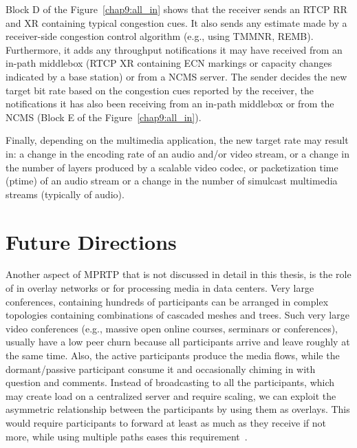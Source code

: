 Block D of the Figure~\ref{chap9:all_in} shows that the receiver sends an RTCP
RR and XR containing typical congestion cues. It also sends any estimate made
by a receiver-side congestion control algorithm (e.g., using TMMNR, REMB).
Furthermore, it adds any throughput notifications it may have received from an
in-path middlebox (RTCP XR containing ECN markings or capacity changes
indicated by a base station) or from a NCMS server. The sender decides the new
target bit rate based on the congestion cues reported by the receiver, the
notifications it has also been receiving from an in-path middlebox or from the
NCMS (Block E of the Figure~\ref{chap9:all_in}).


Finally, depending on the multimedia application, the new target rate may
result in: a change in the encoding rate of an audio and/or video stream, or a
change in the number of layers produced by a scalable video codec, or
packetization time (ptime) of an audio stream or a change in the number of
simulcast multimedia streams (typically of audio).

\section{Future Directions}

Another aspect of MPRTP that is not discussed in detail in this thesis, is the
role of in overlay networks or for processing media in data centers. Very
large conferences, containing hundreds of participants can be arranged in complex
topologies containing combinations of cascaded meshes and trees. Such very
large video conferences (e.g., massive open online courses, serminars or
conferences), usually have a low peer churn because all participants arrive
and leave roughly at the same time. Also, the active participants produce the
media flows, while the dormant/passive participant consume it and occasionally
chiming in with question and comments. Instead of broadcasting to all the
participants, which may create load on a centralized server and require
scaling, we can exploit the asymmetric relationship between the participants
by using them as overlays. This would require participants to forward at least
as much as they receive if not more, while using multiple paths eases this
requirement~\cite{Noh2008,Li2010a,Globisch:AsymGrpComm}.



